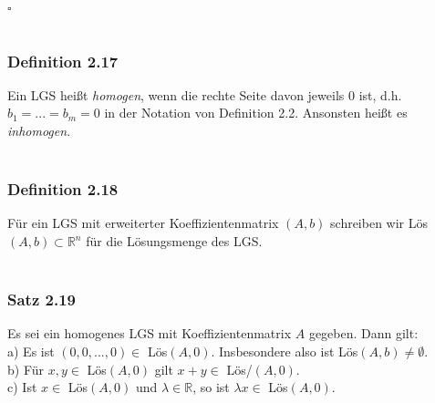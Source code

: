 \documentclass{article}
\begin{document}
$\square$ \\
\\
\subsubsection*{Definition 2.17}
Ein LGS heißt \textit{homogen}, wenn die rechte Seite davon jeweils 0 ist, d.h. $b_1=...=b_m=0$ in der Notation von Definition 2.2. 
Ansonsten heißt es \textit{inhomogen}. \\
\\
\subsubsection*{Definition 2.18}
Für ein LGS mit erweiterter Koeffizientenmatrix $(A,b)$ schreiben wir Lös$(A,b) \subset \mathbb{R}^n$ für die Lösungsmenge des LGS. \\
\\
\subsubsection*{Satz 2.19}
Es sei ein homogenes LGS mit Koeffizientenmatrix $A$ gegeben. Dann gilt: \\
a) Es ist $(0,0,...,0) \in$ Lös$(A,0)$. Insbesondere also ist Lös$(A,b) \neq \emptyset$. \\
b) Für $x,y \in$ Lös$(A,0)$ gilt $x+y \in$ Lös/$(A,0)$. \\
c) Ist $x \in$ Lös$(A,0)$ und $\lambda \in \mathbb{R}$, so ist $\lambda x \in$ Lös$(A,0)$. \\
\\
\end{document}
